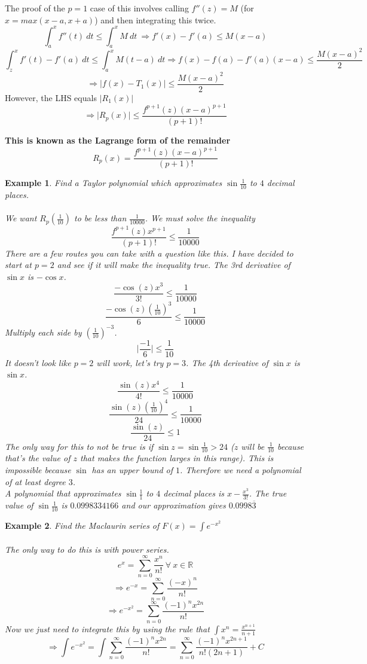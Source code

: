 \documentclass[12 pt]{article}
\newcommand{\sumz}{\sum\limits_{n=0}^{\infty}}
\newcommand{\R}{\mathbb{R}}
\newtheorem*{exmp*}{Example}
\begin{document}
		The proof of the $p=1$ case of this involves calling $f''(z)=M$ (for $x=max(x-a,x+a)$) and then integrating this twice.
		$$\int_a^x f''(t)\ dt \leq \int_a^x M\ dt\ \Rightarrow f'(x)-f'(a) \leq M(x-a)$$
		$$\int_z^x f'(t)-f'(a)\ dt \leq \int_a^x M(t-a)\ dt \Rightarrow f(x)-f(a)-f'(a)(x-a) \leq \frac{M(x-a)^2}{2}$$
		$$\Rightarrow \lvert f(x)-T_1(x)\rvert \leq \frac{M(x-a)^2}{2}$$
		However, the LHS equals $\lvert R_1(x)\rvert$
		$$\Rightarrow \lvert R_p(x)\rvert \leq \frac{f^{p+1}(z)(x-a)^{p+1}}{(p+1)!}$$

		\begin{center}\textbf{This is known as the Lagrange form of the remainder}
		$$R_p(x)=\frac{f^{p+1}(z)(x-a)^{p+1}}{(p+1)!}$$\end{center}

		\begin{exmp*}
			Find a Taylor polynomial which approximates $\sin{\frac{1}{10}}$ to $4$ decimal places.\\\\
			We want $R_p(\frac{1}{10})$ to be less than $\frac{1}{10000}$. We must solve the inequality
			$$\frac{f^{p+1}(z)x^{p+1}}{(p+1)!} \leq \frac{1}{10000}$$
			There are a few routes you can take with a question like this. I have decided to start at $p=2$ and see if it will make the inequality true. The 3rd derivative of $\sin{x}$ is $-\cos{x}$.
			$$\frac{-\cos{(z)}x^3}{3!} \leq \frac{1}{10000}$$
			$$\frac{-\cos{(z)}(\frac{1}{10})^3}{6} \leq \frac{1}{10000}$$
			Multiply each side by $(\frac{1}{10})^{-3}$.
			$$\lvert\frac{-1}{6}\rvert \leq \frac{1}{10}$$
			It doesn't look like $p=2$ will work, let's try $p=3$. The 4th derivative of $\sin{x}$ is $\sin{x}$.
			$$\frac{\sin{(z)}x^4}{4!} \leq \frac{1}{10000}$$
			$$\frac{\sin{(z)}(\frac{1}{10})^4}{24} \leq \frac{1}{10000}$$
			$$\frac{\sin{(z)}}{24} \leq 1$$
			The only way for this to not be true is if $\sin{z}=\sin{\frac{1}{10}}>24$ ($z$ will be $\frac{1}{10}$ because that's the value of $z$ that makes the function larges in this range). This is impossible because $\sin$ has an upper bound of $1$. Therefore we need a polynomial of at least degree $3$.\\
			A polynomial that approximates $\sin{\frac{1}{1}}$ to $4$ decimal places is $x-\frac{x^3}{3!}$. The true value of $\sin{\frac{1}{10}}$ is $0.0998334166$ and our approximation gives $0.0998\overline{3}$
		\end{exmp*}

		\begin{exmp*}
			Find the Maclaurin series of $F(x)=\int e^{-x^2}$\\\\
			The only way to do this is with power series.
			$$e^x=\sumz \frac{x^n}{n!}\ \forall\ x\in\R$$
			$$\Rightarrow e^{-x}=\sumz \frac{(-x)^n}{n!}$$
			$$\Rightarrow e^{-x^2}=\sumz \frac{(-1)^nx^{2n}}{n!}$$
			Now we just need to integrate this by using the rule that $\int x^n = \frac{x^{n+1}}{n+1}$
			$$\Rightarrow \int e^{-x^2}=\int \sumz \frac{(-1)^nx^{2n}}{n!} = \sumz \frac{(-1)^nx^{2n+1}}{n!(2n+1)}+C$$
		\end{exmp*}
\end{document}
